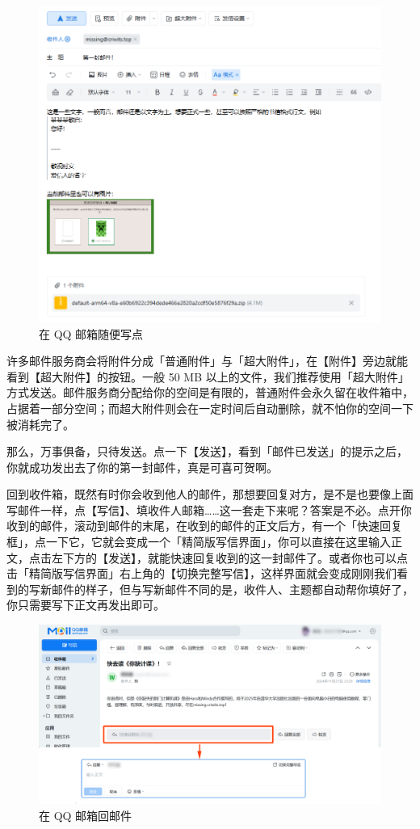 \begin{figure}[htb!]
  \centering
  \includegraphics[width=.8\textwidth]{assets/software/QQ_Mail_Writing_2.png}
  \caption{在 QQ 邮箱随便写点}
  \label{fig:QQ_Mail_Writing_2}
\end{figure}

\begin{note}
  许多邮件服务商会将附件分成「普通附件」与「超大附件」，在【附件】旁边就能看到【超大附件】的按钮。一般 50 MB 以上的文件，我们推荐使用「超大附件」方式发送。邮件服务商分配给你的空间是有限的，普通附件会永久留在收件箱中，占据着一部分空间；而超大附件则会在一定时间后自动删除，就不怕你的空间一下被消耗完了。
\end{note}

那么，万事俱备，只待发送。点一下【发送】，看到「邮件已发送」的提示之后，你就成功发出去了你的第一封邮件，真是可喜可贺啊。

回到收件箱，既然有时你会收到他人的邮件，那想要回复对方，是不是也要像上面写邮件一样，点【写信】、填收件人邮箱……这一套走下来呢？答案是不必。点开你收到的邮件，滚动到邮件的末尾，在收到的邮件的正文后方，有一个「快速回复框」，点一下它，它就会变成一个「精简版写信界面」，你可以直接在这里输入正文，点击左下方的【发送】，就能快速回复收到的这一封邮件了。或者你也可以点击「精简版写信界面」右上角的【切换完整写信】，这样界面就会变成刚刚我们看到的写新邮件的样子，但与写新邮件不同的是，收件人、主题都自动帮你填好了，你只需要写下正文再发出即可。

\begin{figure}[htb!]
  \centering
  \includegraphics[width=.8\textwidth]{assets/software/QQ_Mail_Reply.png}
  \caption{在 QQ 邮箱回邮件}
  \label{fig:QQ_Mail_Reply}
\end{figure}


